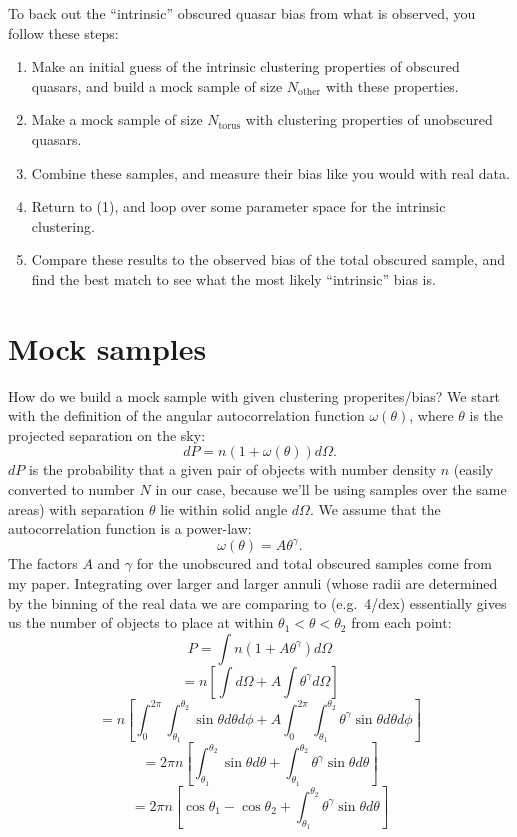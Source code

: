 \documentclass[11pt]{article}
\begin{document}
To back out the ``intrinsic'' obscured quasar bias from what is observed, you follow these steps:
\begin{enumerate}
\item Make an initial guess of the intrinsic clustering properties of obscured quasars, and build a mock sample of size $N_{\textrm{other}}$ with these properties. 

\item Make a mock sample of size $N_{\textrm{torus}}$ with clustering properties of unobscured quasars.

\item Combine these samples, and measure their bias like you would with real data.

\item Return to (1), and loop over some parameter space for the intrinsic clustering.

\item Compare these results to the observed bias of the total obscured sample, and find the best match to see what the most likely ``intrinsic'' bias is.
\end{enumerate}

\section*{Mock samples}
\noindent How do we build a mock sample with given clustering properites/bias?  We start with the definition of the angular autocorrelation function $\omega(\theta)$, where $\theta$ is the projected separation on the sky:
\begin{equation}
dP = n(1+\omega(\theta))d\Omega.
\end{equation}
$dP$ is the probability that a given pair of objects with number density $n$ (easily converted to number $N$ in our case, because we'll be using samples over the same areas) with separation $\theta$ lie within solid angle $d\Omega$.  We assume that the autocorrelation function is a power-law:
\begin{equation}
\omega(\theta) = A \theta^{\gamma}.
\end{equation}
The factors $A$ and $\gamma$ for the unobscured and total obscured samples come from my paper.  Integrating over larger and larger annuli (whose radii are determined by the binning of the real data we are comparing to (e.g.\ 4/dex) essentially gives us the number of objects to place at within $\theta_1 < \theta < \theta_2$ from each point:
\begin{equation}
P = \int n(1+A\theta^{\gamma})d\Omega 
\end{equation}
$$=n\left[\int d\Omega +A \int \theta^{\gamma} d\Omega \right]$$
$$ =n\left[\int_{0}^{2\pi} \int_{\theta_1}^{\theta_2} \sin \theta d\theta d\phi + A\int_0^{2\pi} \int_{\theta_1}^{\theta_2} \theta^{\gamma} \sin \theta d\theta d\phi \right]$$
$$ =2\pi n \left[\int_{\theta_1}^{\theta_2} \sin \theta d\theta + \int_{\theta_1}^{\theta_2} \theta^{\gamma} \sin \theta d\theta \right]$$
$$ =2\pi n \left[\cos \theta_1 - \cos \theta_2 + \int_{\theta_1}^{\theta_2} \theta^{\gamma} \sin \theta d\theta \right]$$
\end{document}
